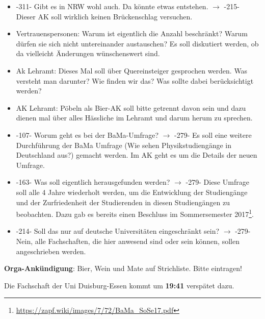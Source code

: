     \begin{itemize}
      \item -311- Gibt es in NRW wohl auch. Da könnte etwas entstehen. $\rightarrow$ -215- Dieser AK soll wirklich keinen Brückenschlag versuchen.
      \item Vertrauenspersonen: Warum ist eigentlich die Anzahl beschränkt? Warum dürfen sie sich nicht untereinander austauschen? Es soll diskutiert werden, ob da vielleicht Änderungen wünschenswert sind.
      \item Ak Lehramt: Dieses Mal soll über Quereinsteiger gesprochen werden. Was versteht man darunter? Wie finden wir das? Was sollte dabei berücksichtigt werden?
      \item AK Lehramt: Pöbeln als Bier-AK soll bitte getrennt davon sein und dazu dienen mal über alles Hässliche im Lehramt und darum herum zu sprechen.
      \item -107- Worum geht es bei der BaMa-Umfrage? $\rightarrow$ -279- Es soll eine weitere Durchführung der BaMa Umfrage (Wie sehen Physikstudiengänge in Deutschland aus?) gemacht werden. Im AK geht es um die Details der neuen Umfrage.
      \item -163- Was soll eigentlich herausgefunden werden? $\rightarrow$ -279- Diese Umfrage soll alle 4 Jahre wiederholt werden, um die Entwicklung der Studiengänge und der Zurfriedenheit der Studierenden in diesen Studiengängen zu beobachten. Dazu gab es bereits einen Beschluss im Sommersemester 2017\footnote{\url{https://zapf.wiki/images/7/72/BaMa_SoSe17.pdf}}.
      \item -214- Soll das nur auf deutsche Universitäten eingeschränkt sein? $\rightarrow$ -279- Nein, alle Fachschaften, die hier anwesend sind oder sein können, sollen angeschrieben werden.
    \end{itemize}

    \begin{info}
      \textbf{Orga-Ankündigung}: Bier, Wein und Mate auf Strichliste. Bitte eintragen!
    \end{info}

    \begin{info}
      Die Fachschaft der Uni Duisburg-Essen kommt um \textbf{19:41} verspätet dazu.
    \end{info}

